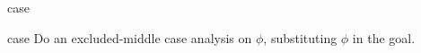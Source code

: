 \begin{tactic}{case}
  \begin{tsyntax}[empty]{case}
  Do an excluded-middle case analysis on $\phi$, substituting $\phi$
  in the goal.
  \end{tsyntax}
\end{tactic}

